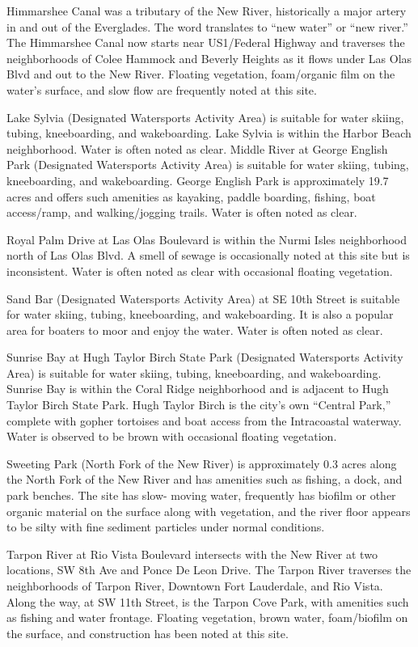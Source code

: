 \documentclass[
]{article}
\begin{document}
Himmarshee Canal was a tributary of the New River, historically a major
artery in and out of the Everglades. The word translates to ``new
water'' or ``new river.'' The Himmarshee Canal now starts near
US1/Federal Highway and traverses the neighborhoods of Colee Hammock and
Beverly Heights as it flows under Las Olas Blvd and out to the New
River. Floating vegetation, foam/organic film on the water's surface,
and slow flow are frequently noted at this site.

Lake Sylvia (Designated Watersports Activity Area) is suitable for water
skiing, tubing, kneeboarding, and wakeboarding. Lake Sylvia is within
the Harbor Beach neighborhood. Water is often noted as clear. Middle
River at George English Park (Designated Watersports Activity Area) is
suitable for water skiing, tubing, kneeboarding, and wakeboarding.
George English Park is approximately 19.7 acres and offers such
amenities as kayaking, paddle boarding, fishing, boat access/ramp, and
walking/jogging trails. Water is often noted as clear.

Royal Palm Drive at Las Olas Boulevard is within the Nurmi Isles
neighborhood north of Las Olas Blvd. A smell of sewage is occasionally
noted at this site but is inconsistent. Water is often noted as clear
with occasional floating vegetation.

Sand Bar (Designated Watersports Activity Area) at SE 10th Street is
suitable for water skiing, tubing, kneeboarding, and wakeboarding. It is
also a popular area for boaters to moor and enjoy the water. Water is
often noted as clear.

Sunrise Bay at Hugh Taylor Birch State Park (Designated Watersports
Activity Area) is suitable for water skiing, tubing, kneeboarding, and
wakeboarding. Sunrise Bay is within the Coral Ridge neighborhood and is
adjacent to Hugh Taylor Birch State Park. Hugh Taylor Birch is the
city's own ``Central Park,'' complete with gopher tortoises and boat
access from the Intracoastal waterway. Water is observed to be brown
with occasional floating vegetation.

Sweeting Park (North Fork of the New River) is approximately 0.3 acres
along the North Fork of the New River and has amenities such as fishing,
a dock, and park benches. The site has slow- moving water, frequently
has biofilm or other organic material on the surface along with
vegetation, and the river floor appears to be silty with fine sediment
particles under normal conditions.

Tarpon River at Rio Vista Boulevard intersects with the New River at two
locations, SW 8th Ave and Ponce De Leon Drive. The Tarpon River
traverses the neighborhoods of Tarpon River, Downtown Fort Lauderdale,
and Rio Vista. Along the way, at SW 11th Street, is the Tarpon Cove
Park, with amenities such as fishing and water frontage. Floating
vegetation, brown water, foam/biofilm on the surface, and construction
has been noted at this site.
\end{document}
